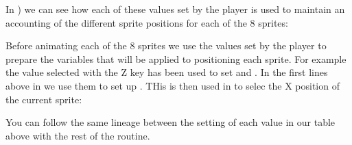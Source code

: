 In ) we can see how each of these values
set by the player is used to maintain an accounting of the different sprite positions for each of the 8 sprites:

%


Before animating each of the 8 sprites we use the values set by the player to prepare the variables
that will be applied to positioning each sprite. For example the value selected with the Z key has been
used to set  and . In the first lines above
in  we use them to set up . THis is then used
in  to selec the X position of the current sprite:


%


You can follow the same lineage between the setting of each value in our table above with the rest of the
 routine.

